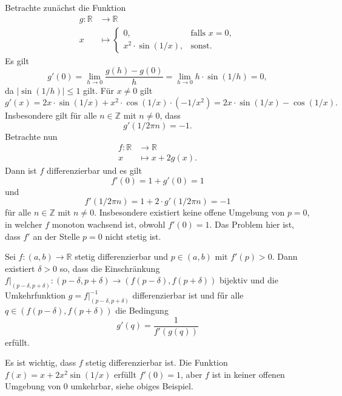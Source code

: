 \documentclass[../main.tex]{subfiles}
\begin{document}
\begin{example}
  Betrachte zunächst die Funktion
  \begin{align*}
    g \colon \mathbb{R} & \to \mathbb{R} \\
    x & \mapsto
    \begin{cases}
      0, & \text{falls $x = 0$}, \\
      x^2 \cdot \sin(1/x), & \text{sonst}.
    \end{cases}
  \end{align*}
Es gilt
\[
  g'(0) = \lim_{h \to 0} \frac{g(h) - g(0)}{h}
  = \lim_{h \to 0} h \cdot \sin(1/h) = 0,
\]
da $|\sin(1/h)| \leq 1$ gilt.
Für $x \neq 0$ gilt
\[
  g'(x) = 2x \cdot \sin(1/x) + x^2 \cdot \cos(1/x) \cdot (-1/x^2)
  = 2x \cdot \sin(1/x) - \cos (1/x).
\]
Insbesondere gilt für alle $n \in \mathbb{Z}$ mit
$n \neq 0$, dass
\[
  g'(1/2\pi n) = -1.
\]
Betrachte nun
\begin{align*}
  f \colon \mathbb{R} & \to \mathbb{R} \\
  x & \mapsto x + 2g(x).
\end{align*}
Dann ist $f$ differenzierbar und es gilt
\[
  f'(0) = 1 + g'(0) = 1
\]
und
\[
  f'(1/2 \pi n) = 1 + 2 \cdot g'(1/ 2 \pi n) = -1
\]
für alle $n \in \mathbb{Z}$ mit $n \neq 0$.
Insbesondere existiert keine offene
Umgebung von $p = 0$,
in welcher $f$ monoton wachsend ist,
obwohl $f'(0) = 1$.
Das Problem hier ist, dass
$f'$ an der Stelle $p = 0$ nicht stetig ist.
\end{example}

\begin{inverse}
  Sei $f \colon (a, b) \to \mathbb{R}$ stetig
  differenzierbar und $p \in (a, b)$ mit $f'(p) > 0$.
  Dann existiert $\delta > 0$ so, dass
  die Einschränkung $f|_{(p - \delta, p + \delta)}
  \colon (p - \delta, p + \delta) \to
  (f(p - \delta), f(p + \delta))$
  bijektiv und die Umkehrfunktion
  $g = f|_{(p - \delta, p + \delta)}^{-1}$ 
  differenzierbar ist und fűr alle
  $q \in (f(p-\delta), f(p + \delta))$ die Bedingung
  \[
    g'(q) = \frac{1}{f'(g(q))}
  \]
  erfüllt.
\end{inverse}

\begin{remark}
  Es ist wichtig, dass
  $f$ stetig differenzierbar ist.
  Die Funktion $f(x) = x + 2 x^2 \sin(1/x)$ 
  erfüllt $f'(0) = 1$, aber  $f$ ist in
  keiner offenen Umgebung von $0$ 
  umkehrbar, siehe obiges Beispiel.
\end{remark}
\end{document}
